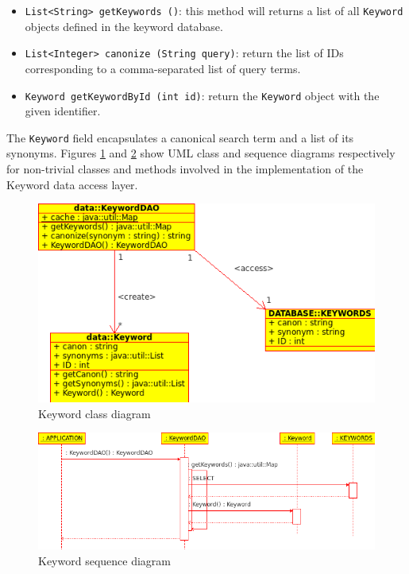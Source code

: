 \documentclass[10pt]{report}
\begin{document}
\begin{itemize}
\item \texttt{List<String> getKeywords ()}: this method
  will returns a list of all \texttt{Keyword} objects defined in the
  keyword database. 

\item \texttt{List<Integer> canonize (String query)}: return the list
  of IDs corresponding to a comma-separated list of query terms.

\item \texttt{Keyword getKeywordById (int id)}: return the
  \texttt{Keyword} object with the given identifier.
\end{itemize}

The \texttt{Keyword} field encapsulates a canonical search term and a
list of its synonyms. Figures \ref{fig:keywordclassdiagram} and
\ref{fig:keywordsequencediagram} show UML class and sequence diagrams
respectively for non-trivial classes and methods involved in the
implementation of the Keyword data access layer. 

\begin{figure}
  \begin{center}
	\includegraphics[width=\textwidth,height=!]{keywordclassdiagram}
  \end{center}
  \caption{Keyword class diagram}
  \label{fig:keywordclassdiagram}
\end{figure} 

\begin{figure}
  \begin{center}
	\includegraphics[width=\textwidth,height=!]{keywordsequencediagram}
  \end{center}
  \caption{Keyword sequence diagram}
  \label{fig:keywordsequencediagram}
\end{figure} 
\end{document}
